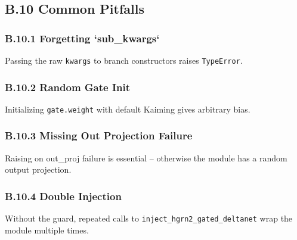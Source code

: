 \subsection{B.10 Common Pitfalls}

\subsubsection{B.10.1 Forgetting `sub\_kwargs`}

Passing the raw \texttt{kwargs} to branch constructors raises \texttt{TypeError}.

\subsubsection{B.10.2 Random Gate Init}

Initializing \texttt{gate.weight} with default Kaiming gives arbitrary bias.

\subsubsection{B.10.3 Missing Out Projection Failure}

Raising on out\_proj failure is essential -- otherwise the module has a 
random output projection.

\subsubsection{B.10.4 Double Injection}

Without the guard, repeated calls to \texttt{inject\_hgrn2\_gated\_deltanet} wrap the 
module multiple times.

